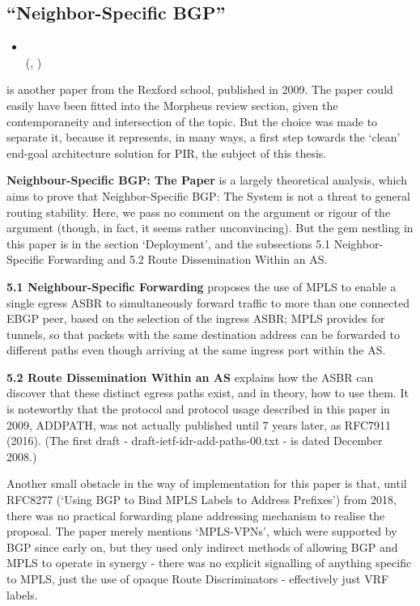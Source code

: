 \subsection{``Neighbor-Speciﬁc BGP''}

\begin{itemize}
    \item {}\\(\citeauthor{Wang2009a}, \citeyear{Wang2009a})~\cite{Wang2009a}
\end{itemize}

is another paper from the Rexford school, published in 2009.  The paper could easily have been fitted into the Morpheus review section, given the contemporaneity and intersection of the topic.  But the choice was made to separate it, because it represents, in many ways, a first step towards the `clean' end-goal architecture solution for PIR, the subject of this thesis.

\textbf{Neighbour-Speciﬁc BGP: The Paper} is a largely theoretical analysis, which aims to prove that Neighbor-Speciﬁc BGP: The System is not a threat to general routing stability.  Here, we pass no comment on the argument or rigour of the argument (though, in fact, it seems rather unconvincing).  But the gem nestling in this paper is in the section `Deployment', and the subsections 5.1 Neighbor-Speciﬁc Forwarding and 5.2 Route Dissemination Within an AS.


\textbf{5.1 Neighbour-Speciﬁc Forwarding} proposes the use of MPLS to enable a single egress ASBR to simultaneously forward traffic to more than one connected EBGP peer, based on the selection of the ingress ASBR; MPLS provides for tunnels, so that packets with the same destination address can be forwarded to different paths even though arriving at the same ingress port within the AS.


\textbf{5.2 Route Dissemination Within an AS} explains how the ASBR can discover that these distinct egress paths exist, and in theory, how to use them.
It is noteworthy that the protocol and protocol usage described in this paper in 2009, ADDPATH, was not actually published until 7 years later, as RFC7911 \cite{rfc7911} (2016). (The first draft - draft-ietf-idr-add-paths-00.txt - is dated December 2008.)


Another small obstacle in the way of implementation for this paper is that, until RFC8277 \cite{rfc8277}  (`Using BGP to Bind MPLS Labels to Address Prefixes') from 2018, there was no practical forwarding plane addressing mechanism to realise the proposal. The paper merely mentions `MPLS-VPNs', which were supported by BGP since early on, but they used only indirect methods of allowing BGP and MPLS to operate in synergy - there was no explicit signalling of anything specific to MPLS, just the use of opaque Route Discriminators - effectively just VRF labels.

